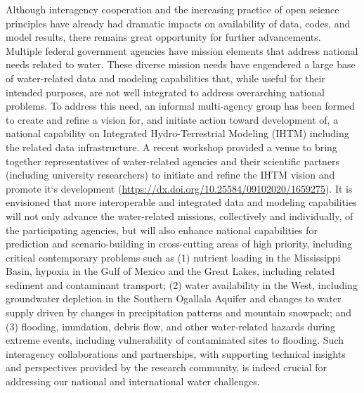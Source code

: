 \documentclass[preprint,review, 12pt]{elsarticle}
\begin{document}
Although interagency cooperation and the increasing practice of open science principles have already had dramatic impacts on availability of data, codes, and model results, there remains great opportunity for further advancements. Multiple federal government agencies have mission elements that address national needs related to water. These diverse mission needs have engendered a large base of water-related data and modeling capabilities that, while useful for their intended purposes, are not well integrated to address overarching national problems. To address this need, an informal multi-agency group has been formed to create and refine a vision for, and initiate action toward development of, a national capability on Integrated Hydro-Terrestrial Modeling (IHTM) including the related data infrastructure. A recent workshop provided a venue to bring together representatives of water-related agencies and their scientific partners (including university researchers) to initiate and refine the IHTM vision and promote it`s development (\url{https://dx.doi.org/10.25584/09102020/1659275}). It is envisioned that more interoperable and integrated data and modeling capabilities will not only advance the water-related missions, collectively and individually, of the participating agencies, but will also enhance national capabilities for prediction and scenario-building in cross-cutting areas of high priority, including critical contemporary problems such as (1) nutrient loading in the Mississippi Basin, hypoxia in the Gulf of Mexico and the Great Lakes, including related sediment and contaminant transport; (2) water availability in the West, including groundwater depletion in the Southern Ogallala Aquifer and changes to water supply driven by changes in precipitation patterns and mountain snowpack; and (3) flooding, inundation, debris flow, and other water-related hazards during extreme events, including vulnerability of contaminated sites to flooding. Such interagency collaborations and partnerships, with supporting technical insights and perspectives provided by the research community, is indeed crucial for addressing our national and international water challenges. 
 
 
    
\end{document}
